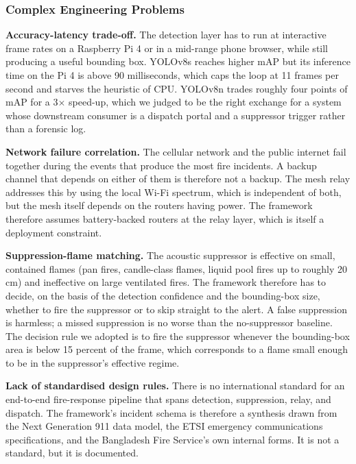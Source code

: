 \subsubsection{Complex Engineering Problems}

\textbf{Accuracy-latency trade-off.} The detection layer has to run at interactive frame rates on a Raspberry Pi 4 or in a mid-range phone browser, while still producing a useful bounding box. YOLOv8s reaches higher mAP but its inference time on the Pi 4 is above 90 milliseconds, which caps the loop at 11 frames per second and starves the heuristic of CPU. YOLOv8n trades roughly four points of mAP for a 3$\times$ speed-up, which we judged to be the right exchange for a system whose downstream consumer is a dispatch portal and a suppressor trigger rather than a forensic log.

\textbf{Network failure correlation.} The cellular network and the public internet fail together during the events that produce the most fire incidents. A backup channel that depends on either of them is therefore not a backup. The mesh relay addresses this by using the local Wi-Fi spectrum, which is independent of both, but the mesh itself depends on the routers having power. The framework therefore assumes battery-backed routers at the relay layer, which is itself a deployment constraint.

\textbf{Suppression-flame matching.} The acoustic suppressor is effective on small, contained flames (pan fires, candle-class flames, liquid pool fires up to roughly 20 cm) and ineffective on large ventilated fires. The framework therefore has to decide, on the basis of the detection confidence and the bounding-box size, whether to fire the suppressor or to skip straight to the alert. A false suppression is harmless; a missed suppression is no worse than the no-suppressor baseline. The decision rule we adopted is to fire the suppressor whenever the bounding-box area is below 15 percent of the frame, which corresponds to a flame small enough to be in the suppressor's effective regime.

\textbf{Lack of standardised design rules.} There is no international standard for an end-to-end fire-response pipeline that spans detection, suppression, relay, and dispatch. The framework's incident schema is therefore a synthesis drawn from the Next Generation 911 data model, the ETSI emergency communications specifications, and the Bangladesh Fire Service's own internal forms. It is not a standard, but it is documented.

